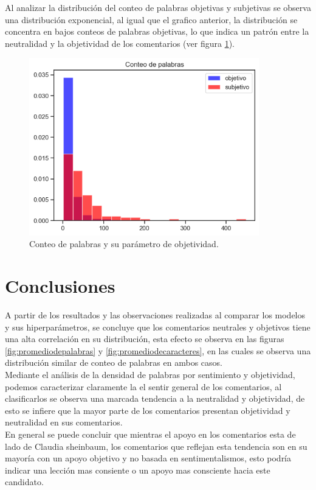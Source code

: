 Al analizar la distribución del conteo de palabras objetivas y subjetivas se observa una distribución exponencial, al igual que el grafico anterior, la distribución se concentra en bajos conteos de palabras objetivas, lo que indica un patrón entre la neutralidad y la objetividad de los comentarios (ver figura \ref{fig:CPPo}). 

\begin{figure}[!h]
	\centering
	\includegraphics[width=10cm]{Images/Palabras_objetividad}
	\caption{Conteo de palabras y su parámetro de objetividad.}
	\label{fig:CPPo}
\end{figure}
\chapter{Conclusiones}

A partir de los resultados y las observaciones realizadas al comparar los modelos y sus hiperparámetros, se concluye que los comentarios neutrales y objetivos tiene una alta correlación en su distribución, esta efecto se observa en las figuras \ref{fig:promediodepalabras} y \ref{fig:promediodecaracteres}, en las cuales se observa una distribución similar de conteo de palabras en ambos casos.\\

Mediante el análisis de la densidad de palabras por sentimiento y objetividad, podemos caracterizar claramente la el sentir general de los comentarios, al clasificarlos se observa una marcada tendencia a la neutralidad y objetividad, de esto se infiere que la mayor parte de los comentarios presentan objetividad y neutralidad en sus comentarios.\\

En general se puede concluir que mientras el apoyo en los comentarios esta de lado de Claudia sheinbaum, los comentarios que reflejan esta tendencia son en su mayoría con un apoyo objetivo y no basada en sentimentalismos, esto podría indicar una lección mas consiente o un apoyo mas consciente hacia este candidato.\\



